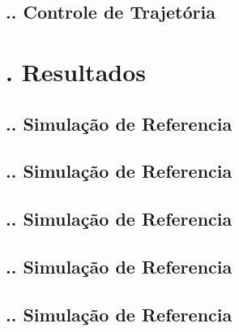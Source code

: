 \documentclass[aspectratio=169]{beamer}
\begin{document}
\subsection{\insertsectionnumber .\insertsubsectionnumber . Controle de Trajetória}
\begin{frame}
  \frametitle{\insertsubsection}
\end{frame}

\section{\insertsectionnumber . Resultados}

\subsection{\insertsectionnumber .\insertsubsectionnumber . Simulação de Referencia}
\begin{frame}
  \frametitle{\insertsubsection}
\end{frame}

\subsection{\insertsectionnumber .\insertsubsectionnumber . Simulação de Referencia}
\begin{frame}
  \frametitle{\insertsubsection}
\end{frame}

\subsection{\insertsectionnumber .\insertsubsectionnumber . Simulação de Referencia}
\begin{frame}
  \frametitle{\insertsubsection}
\end{frame}

\subsection{\insertsectionnumber .\insertsubsectionnumber . Simulação de Referencia}
\begin{frame}
  \frametitle{\insertsubsection}
\end{frame}

\subsection{\insertsectionnumber .\insertsubsectionnumber . Simulação de Referencia}
\begin{frame}
  \frametitle{\insertsubsection}
\end{frame}
\end{document}
